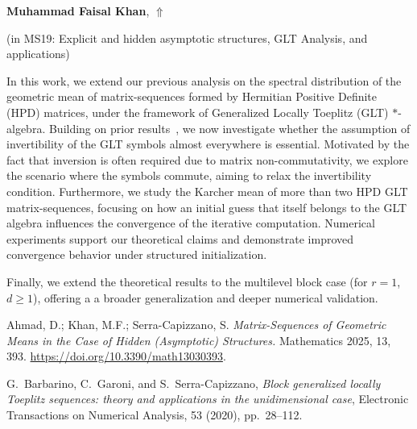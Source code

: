 \documentclass[ILAS2025-program.tex]{subfiles}
\begin{document}
     \hypertarget{down0257}{}\begin{ilasabstract}
    
    \textbf{Muhammad Faisal Khan},  \hfill \hyperlink{up0257}{$\Uparrow$}
    
    (in {\color{mstitle}MS19: Explicit and hidden asymptotic structures, GLT Analysis, and applications})
        
        \mtskip
    \begin{bibunit}
        In this work, we extend our previous analysis on the spectral distribution of the geometric mean of matrix-sequences formed by Hermitian Positive Definite (HPD) matrices, under the framework of Generalized Locally Toeplitz (GLT) $\ast$-algebra. Building on prior results~\cite{ahmad2025matrix}, we now investigate whether the assumption of invertibility of the GLT symbols almost everywhere is essential. Motivated by the fact that inversion is often required due to matrix non-commutativity, we explore the scenario where the symbols commute, aiming to relax the invertibility condition. Furthermore, we study the Karcher mean of more than two HPD GLT matrix-sequences, focusing on how an initial guess that itself belongs to the GLT algebra influences the convergence of the iterative computation. Numerical experiments support our theoretical claims and demonstrate improved convergence behavior under structured initialization.

Finally, we extend the theoretical results to the multilevel block case (for $r = 1$, $d \geq 1$), offering a a broader generalization and deeper numerical validation. 

\vspace{2em}

\begin{thebibliography}{99}

Ahmad, D.; Khan, M.F.; Serra-Capizzano, S. \textit{Matrix-Sequences of Geometric Means in the Case of Hidden (Asymptotic) Structures.} Mathematics 2025, 13, 393.
\url{https://doi.org/10.3390/math13030393}.

G.~Barbarino, C.~Garoni, and S.~Serra-Capizzano, \textit{Block generalized locally Toeplitz sequences: theory and applications in the unidimensional case},
Electronic Transactions on Numerical Analysis, 53 (2020), pp.~28--112.


\end{thebibliography}
\end{bibunit}
\end{ilasabstract}
\end{document}
